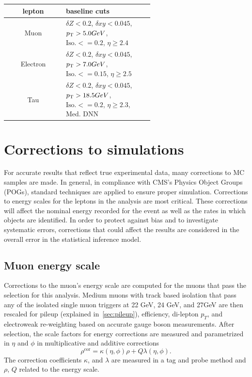 \begin{table}[h!tbp]
\centering
{}
\begin{tabular*}{0.8\textwidth}{c|p{0.6\linewidth}}
\hline
lepton          & baseline cuts \\\hline 
Muon            & $\delta Z < 0.2$, $\delta xy < 0.045$, $p_{\mathrm{T}} > 5.0 GeV$, $\text{Iso.} <= 0.2$, $\eta \geq 2.4$\\\hline
Electron        & $\delta Z < 0.2$, $\delta xy < 0.045$, $p_{\mathrm{T}} > 7.0 GeV$, $\text{Iso.} <= 0.15$, $\eta \geq 2.5$ \\\hline
Tau             & $\delta Z < 0.2$, $\delta xy < 0.045$, $p_{\mathrm{T}} > 18.5 GeV$, $\text{Iso.} <= 0.2$, $\eta \geq 2.3$, Med. DNN \\\hline
\end{tabular*}
\end{table}


\section{Corrections to simulations}
\label{sec:corrections}

For accurate results that reflect true experimental data, many corrections to MC samples are made. In general, in compliance with CMS's Physics Object Groups (POGs), standard techniques are applied to ensure proper simulation. Corrections to energy scales for the leptons in the analysis are most critical. These corrections will affect the nominal energy recorded for the event as well as the rates in which objects are identified.  In order to protect against bias and to investigate systematic errors, corrections that could affect the results are considered in the overall error in the statistical inference model.

\subsection{Muon energy scale}
Corrections to the muon's energy scale are computed for the muons that pass the selection for this analysis. Medium muons with track based isolation that pass any of the isolated single muon triggers at 22 GeV, 24 GeV, and 27GeV are then rescaled for pileup (explained in~\ref{sec:pileup}), efficiency, di-lepton $p_T$, and electroweak re-weighting based on accurate gauge boson measurements. After selection, the scale factors for energy corrections are measured and parametrized in $\eta$ and $\phi$ in multiplicative and additive corrections 
\begin{equation}\rho^{\text{cor}}=\kappa(\eta,\phi)\rho+Q \lambda(\eta,\phi)\text{.}\end{equation} 
The correction coefficients $\kappa$, and $\lambda$ are measured in a tag and probe method and $\rho$, $Q$ related to the energy scale.

